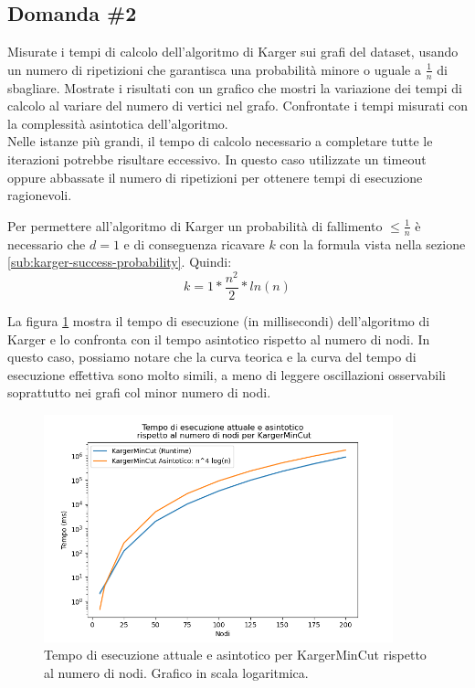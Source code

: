 \subsection{Domanda \#2}
\label{sec:question-2}

\begin{displayquote}
Misurate i tempi di calcolo dell'algoritmo di Karger sui grafi del
dataset, usando un numero di ripetizioni che garantisca una
probabilità minore o uguale a $\frac{1}{n}$ di sbagliare. Mostrate i
risultati con un grafico che mostri la variazione dei tempi di calcolo
al variare del numero di vertici nel grafo. Confrontate i tempi
misurati con la complessità asintotica dell'algoritmo. \\

\noindent Nelle istanze più grandi, il tempo di calcolo necessario a
completare tutte le iterazioni potrebbe risultare eccessivo. In questo
caso utilizzate un timeout oppure abbassate il numero di ripetizioni
per ottenere tempi di esecuzione ragionevoli.
\end{displayquote}

\noindent Per permettere all'algoritmo di Karger un probabilità di
fallimento $ \leq \frac{1}{n}$ è necessario che $d = 1$ e di
conseguenza ricavare $k$ con la formula vista nella sezione
\ref{sub:karger-success-probability}. Quindi:
$$ k = 1 * \frac{n^2}{2} * ln(n)$$

\noindent La figura \ref{fig:karger-runtime-chart} mostra il tempo di
esecuzione (in millisecondi) dell'algoritmo di Karger e lo confronta con il tempo asintotico rispetto al numero di nodi. In questo caso, possiamo notare che la curva teorica e la curva del tempo di esecuzione effettiva sono molto simili, a meno di leggere oscillazioni osservabili soprattutto nei grafi col minor numero di nodi.

\begin{figure}[ht]
    \centering

    \includegraphics[width=0.9\textwidth]{./images/Tempo_di_esecuzione_attuale_e_asintotico__rispetto_al_numero_di_nodi_per_KargerMinCut.png}

    \caption{Tempo di esecuzione attuale e asintotico per KargerMinCut rispetto al numero di nodi. Grafico in scala logaritmica.}
    \label{fig:karger-runtime-chart}
\end{figure}

